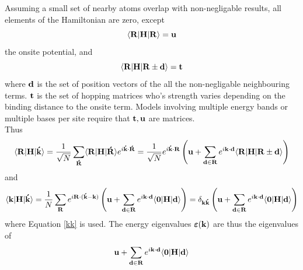 \documentclass[a4paper, 12pt]{article}
\begin{document}
		Assuming a small set of nearby atoms overlap with non-negligable results, all elements of the Hamiltonian are zero, except
		\begin{equation}\label{u}
			\langle{\bf R}|{\bf H}|{\bf R}\rangle = \bf u
		\end{equation}
		the onsite potential, and 
		\begin{equation}\label{t}
			\langle{\bf R}|{\bf H}|{\bf R}\pm {\bf d}\rangle = \bf t
		\end{equation}
		where $\bf d$ is the set of position vectors of the all the non-negligable neighbouring terms. $\bf t$ is the set of hopping matrices who's strength varies depending on the binding distance to the onsite term. Models involving multiple energy bands or multiple bases per site require that $\bf t, u$ are matrices. 
		\\[2mm]Thus
		\begin{equation}
			\langle{\bf R}|{\bf H}|{\bf \acute{k}}\rangle = \frac{1}{\sqrt{N}}\sum_{\bf \acute{R}}\langle{\bf {R}}|{\bf H}|{\bf \acute{R}}\rangle e^{i\bf \acute{k}\cdot \acute{R}}= \frac{1}{\sqrt{N}}e^{i\bf \acute{k}\cdot R}\left({\bf u}+\sum_{{\bf d }\in {\bf R}}e^{i{\bf k \cdot d}}\langle{\bf R}|{\bf H}|{\bf R}\pm {\bf d}\rangle\right)
		\end{equation}
		and
		\begin{equation}\label{sumtb}
			\langle{\bf k}|{\bf H}|{\bf \acute{k}}\rangle = \frac{1}{N}\sum_{\bf R} e^{i\bf R\cdot (\acute{k}-k)}\left( {\bf u} + \sum_{{\bf d}\in {\bf R}}e^{i{\bf k \cdot d}}\langle\bf 0|H|d\rangle\right) = \delta_{\bf k \acute{k}}\left( {\bf u} + \sum_{{\bf d}\in {\bf R}}e^{i{\bf k \cdot d}}\langle\bf 0|H|d\rangle\right)
		\end{equation}
		where Equation \eqref{kk} is used.
		The energy eigenvalues $\bm\varepsilon({\bf k})$ are thus the eigenvalues of
		\begin{equation}
			{\bf u} + \sum_{{\bf d}\in {\bf R}}e^{i{\bf k \cdot d}}\langle\bf 0|H|d\rangle
			\label{tight}
		\end{equation}
\end{document}
